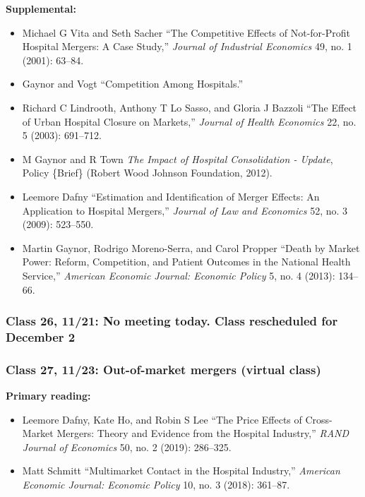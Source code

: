\documentclass[11pt,]{article}
\providecommand{\tightlist}{%
  \setlength{\itemsep}{0pt}\setlength{\parskip}{0pt}}
\begin{document}
\textbf{Supplemental:}

\begin{itemize}
\tightlist
\item
  Michael G Vita and Seth Sacher {``The Competitive Effects of
  Not-for-Profit Hospital Mergers: A Case Study,''} \emph{Journal of
  Industrial Economics} 49, no. 1 (2001): 63--84.
\item
  Gaynor and Vogt {``Competition Among {Hospitals}.''}
\item
  Richard C Lindrooth, Anthony T Lo Sasso, and Gloria J Bazzoli {``The
  Effect of Urban Hospital Closure on Markets,''} \emph{Journal of
  Health Economics} 22, no. 5 (2003): 691--712.
\item
  M Gaynor and R Town \emph{The Impact of Hospital Consolidation -
  {Update}}, Policy \{Brief\} (Robert Wood Johnson Foundation, 2012).
\item
  Leemore Dafny {``Estimation and {Identification} of {Merger}
  {Effects}: {An} {Application} to {Hospital} {Mergers},''}
  \emph{Journal of Law and Economics} 52, no. 3 (2009): 523--550.
\item
  Martin Gaynor, Rodrigo Moreno-Serra, and Carol Propper {``Death by
  Market Power: Reform, Competition, and Patient Outcomes in the
  {National} {Health} {Service},''} \emph{American Economic Journal:
  Economic Policy} 5, no. 4 (2013): 134--66.
\end{itemize}

\hypertarget{class-26-1121-no-meeting-today.-class-rescheduled-for-december-2}{%
\subsubsection{Class 26, 11/21: No meeting today. Class rescheduled for
December
2}\label{class-26-1121-no-meeting-today.-class-rescheduled-for-december-2}}

\hypertarget{class-27-1123-out-of-market-mergers-virtual-class}{%
\subsubsection{\texorpdfstring{Class 27, 11/23: Out-of-market mergers
(\textbf{virtual
class})}{Class 27, 11/23: Out-of-market mergers (virtual class)}}\label{class-27-1123-out-of-market-mergers-virtual-class}}

\textbf{Primary reading:}

\begin{itemize}
\tightlist
\item
  Leemore Dafny, Kate Ho, and Robin S Lee {``The Price Effects of
  Cross-Market Mergers: Theory and Evidence from the Hospital
  Industry,''} \emph{RAND Journal of Economics} 50, no. 2 (2019):
  286--325.
\item
  Matt Schmitt {``Multimarket {Contact} in the {Hospital} {Industry},''}
  \emph{American Economic Journal: Economic Policy} 10, no. 3 (2018):
  361--87.
\end{itemize}
\end{document}
